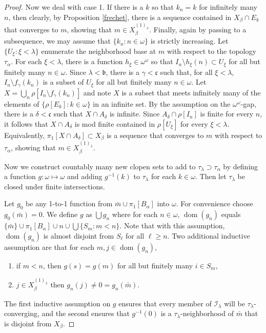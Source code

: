 \documentclass{amsart}
\theoremstyle{definition}
\theoremstyle{remark}
\def\dom{\operatorname{dom}}
\begin{document}
\begin{proof}
Now we deal with case 1.
If there is a $k$ so that $k_n = k$ for infinitely many $n$,
 then clearly, by Proposition \ref{frechet}, there is a sequence
contained in $X_\beta\cap E_{k}$ that converges to $m$, showing
that $m\in X_{\beta}^{(1)_\lambda}$. 
Finally, again by passing to a subsequence, we may assume
that $\{ k_n : n\in\omega\}$ is strictly increasing.
Let $\{ U_\xi : \xi < \lambda\}$ enumerate the neighborhood
base at $m$ with respect to the topology $\tau_\alpha$. 
For each $\xi<\lambda$, there is a function $h_\xi\in\omega^\omega$
so that $I_n\setminus h_\xi(n)\subset U_\xi$ for all but finitely
many $n\in\omega$. Since $\lambda<\mathfrak b$, there is a
$\gamma<\mathfrak c$ such that, for all $\xi <\lambda$, 
$I_n\setminus f_\gamma(k_n)$ is a subset of $U_\xi$
for all but finitely many $n\in\omega$. Let $X =\bigcup_n 
\rho[I_n\setminus f_\gamma(k_n)]$
and note  $X$ is a subset that meets infinitely many of
the elements of $\{ \rho[E_k] : k\in\omega\}$ in an infinite
set.  By the assumption on the $\omega^\omega$-gap, 
 there is a $\delta<\mathfrak c$ such that $X\cap A_\delta$
 is infinite. Since $A_\delta\cap \rho[I_n]$ is finite
 for every $n$, it follows that $X\cap A_\delta$ is 
 mod finite contained in $\rho[U_\xi]$ for every $\xi<\lambda$.
 Equivalently, $\pi_1[X\cap A_\delta]\subset X_\beta$ is a sequence 
 that converges to $m$ with respect to $\tau_\alpha$, showing
 that $m\in X_\beta^{(1)_\lambda}$.
\medskip

Now we construct countably many new clopen sets to
add to $\tau_\lambda\supset \tau_\alpha$ by defining
a function $g:\omega\mapsto \omega$ and adding
$g^{-1}(k)$ to $\tau_\lambda$ for each $k\in\omega$.
Then let $\tau_\lambda$ be closed under finite intersections.

 Let $g_0$ be any 1-to-1 function from $\bar m\cup \pi_1[B_\alpha]$
 into $\omega$. For convenience choose $g_0(\bar m)=0$.
 We define $g$  as $\bigcup g_n$ where for each
 $n\in\omega$, $\dom(g_n)$ equals $\{\bar m\}\cup 
 \pi_1[B_\alpha]\cup n \cup \bigcup\{S_m: m<n\} $.
 Note that with this assumption, $\dom(g_n)$ is almost disjoint
 from $S_\ell$ for all $\ell\geq n$. Two additional
 inductive assumption are that for each $m,j\in \dom(g_n)$,
 \begin{enumerate}
  \item  if $m<n$, then $g(s)=g(m)$ for all but finitely many $i\in S_m$,
\item     $j\in X_\beta^{(1)_\lambda}$  
then $g_n(j)\neq 0=g_n(\bar m)$.  
\end{enumerate}
The first inductive assumption on $g$ ensures that every member
of $\mathcal I_\lambda$ will be $\tau_\lambda$-converging,
and the second ensures that $g^{-1}(0)$  
is a $\tau_\lambda$-neighborhood of $\bar m$ that is disjoint from
  $X_\beta $.



\end{proof}
\end{document}
